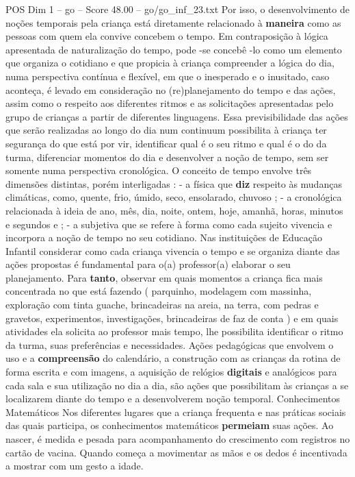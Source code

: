 \begin{textsample}{POS Dim 1 – go – Score 48.00 – go/go\_inf\_23.txt}
Por isso, o desenvolvimento de noções temporais pela criança está diretamente relacionado à \textbf{maneira} como as pessoas com quem ela convive concebem o tempo.
Em contraposição à lógica apresentada de naturalização do tempo, pode -se concebê -lo como um elemento que organiza o cotidiano e que propicia à criança compreender a lógica do dia, numa perspectiva contínua e flexível, em que o inesperado e o inusitado, caso aconteça, é levado em consideração no (re)planejamento do tempo e das ações, assim como o respeito aos diferentes ritmos e as solicitações apresentadas pelo grupo de crianças a partir de diferentes linguagens.
Essa previsibilidade das ações que serão realizadas ao longo do dia num continuum possibilita à criança ter segurança do que está por vir, identificar qual é o seu ritmo e qual é o do da turma, diferenciar momentos do dia e desenvolver a noção de tempo, sem ser somente numa perspectiva cronológica.
O conceito de tempo envolve três dimensões distintas, porém interligadas : - a física que \textbf{diz} respeito às mudanças climáticas, como, quente, frio, úmido, seco, ensolarado, chuvoso ; - a cronológica relacionada à ideia de ano, mês, dia, noite, ontem, hoje, amanhã, horas, minutos e segundos e ; - a subjetiva que se refere à forma como cada sujeito vivencia e incorpora a noção de tempo no seu cotidiano.
Nas instituições de Educação Infantil considerar como cada criança vivencia o tempo e se organiza diante das ações propostas é fundamental para o(a) professor(a) elaborar o seu planejamento.
Para \textbf{tanto}, observar em quais momentos a criança fica mais concentrada no que está fazendo ( parquinho, modelagem com massinha, exploração com tinta guache, brincadeiras na areia, na terra, com pedras e gravetos, experimentos, investigações, brincadeiras de faz de conta ) e em quais atividades ela solicita ao professor mais tempo, lhe possibilita identificar o ritmo da turma, suas preferências e necessidades.
Ações pedagógicas que envolvem o uso e a \textbf{compreensão} do calendário, a construção com as crianças da rotina de forma escrita e com imagens, a aquisição de relógios \textbf{digitais} e analógicos para cada sala e sua utilização no dia a dia, são ações que possibilitam às crianças a se localizarem diante do tempo e a desenvolverem noção temporal.
Conhecimentos Matemáticos Nos diferentes lugares que a criança frequenta e nas práticas sociais das quais participa, os conhecimentos matemáticos \textbf{permeiam} suas ações.
Ao nascer, é medida e pesada para acompanhamento do crescimento com registros no cartão de vacina.
Quando começa a movimentar as mãos e os dedos é incentivada a mostrar com um gesto a idade.

\end{textsample}
